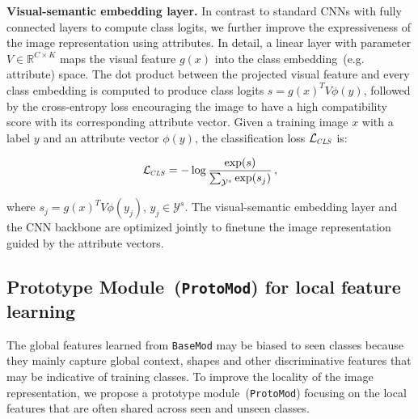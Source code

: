\textbf{Visual-semantic embedding layer.} In contrast to standard CNNs with fully connected layers to compute class logits, we further improve the expressiveness of the image representation using attributes. In detail, a linear layer with parameter $V \in \mathbb{R}^{C\times K}$ maps the visual feature $g(x)$ into the class embedding~(e.g. attribute) space. 
The dot product between the projected visual feature and every class embedding is computed to produce class logits $s = g(x)^T V \phi(y)$, followed by the cross-entropy loss encouraging the image to have a high compatibility score with its corresponding attribute vector.
Given a training image $x$ with a label $y$ and an attribute vector $\phi(y)$, the classification loss $\mathcal{L}_{\Scale[0.6]{CLS}}$ is:
\begin{linenomath*}
    \begin{equation}
        \mathcal{L}_{\Scale[0.6]{CLS}}  = -\log \frac{\exp(s)}{\sum_{\mathcal{Y}^s}\exp(s_j)} \,,
        \label{equ:CE}
    \end{equation}
\end{linenomath*}
where $s_j = g(x)^T V \phi(y_j)$, $y_j \in \mathcal{Y}^s$.
The visual-semantic embedding layer and the CNN backbone are optimized jointly to finetune the image representation guided by the attribute vectors. 



\subsection{Prototype Module~(\texttt{ProtoMod}) for local feature learning}

The global features learned from \texttt{BaseMod} may be biased to seen classes because they mainly capture global context, shapes and other discriminative features that may be indicative of training classes. To improve the locality of the image representation, we propose a prototype module~(\texttt{ProtoMod}) focusing on the local features that are often shared across seen and unseen classes.


\begin{comment}
\myparagraph{Attribute prototypes.} \texttt{ProtoMod} takes as input $f(x)\in \mathbb{R}^{H\times W \times C}$ coming from the \texttt{Image Encoder} composed by the local features $f_{i,j}(x)\in \mathbb{R}^{C}$ that encode the information of local image regions where local attributes and object parts appear.
We learn a set of attribute prototypes $P = \left \{ p_k \in \mathbb{R}^{C} \right \}_{k=1}^K$ to predict attributes from those local features, where $p_k$ denotes the prototype for the $k$-th attribute.
As a schematic illustration, $p_1$ and $p_2$ in Figure~\ref{fig:APN} correspond to the prototypes for \textit{black eye} and \textit{blue crown} respectively. For each attribute~(e.g. $k$-th attribute), we compute a similarity map $M^k \in \mathbb{R}^{H\times W}$ that measures the compatibility between its prototype $p_k$ and all the local features, where each element of $M^k$ is computed by $M_{i, j}^k=\langle p_k, f_{i,j}(x)\rangle$. Afterwards, we predict the $k$-th attribute $\hat{a}_k$ by taking the maximum value in the similarity map $M^k$:
\end{comment}

